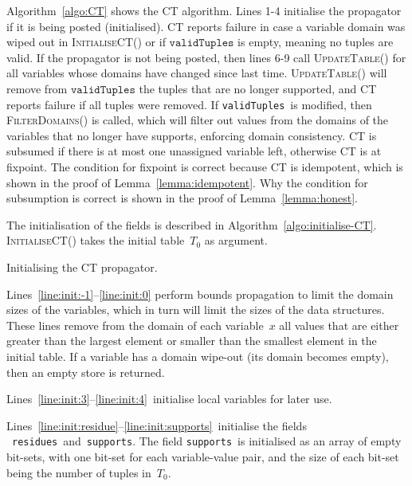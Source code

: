 \documentclass[a4paper,11pt]{article}
\newcommand{\Algoref}[1]{Algorithm~\ref{#1}}
\newcommand{\Linesref}[2]{Lines~\ref{#1}--\ref{#2}}
\newcommand{\CurrTable}{\texttt{validTuples}}
\newcommand{\Supports}{\texttt{supports}}
\newcommand{\Residues}{\texttt{residues}}
\def\UpdateTable{\textsc{UpdateTable}}
\def\FilterDomains{\textsc{FilterDomains}}
\def\InitialiseCT{\textsc{InitialiseCT}}
\newcommand{\localvar}[1]{\mathit{#1}}
\numberwithin{equation}{section}
\begin{document}
\Algoref{algo:CT} shows the CT algorithm. Lines 1-4 initialise the propagator
if it is being posted (initialised). CT reports failure in case a variable domain was
wiped out in \InitialiseCT() or if $\CurrTable$ is empty, meaning no tuples are valid.
If the propagator is not being posted, then
lines 6-9 call \UpdateTable() for all variables whose domains have changed
since last time. \UpdateTable() will remove from $\CurrTable$ the tuples that
are no longer supported, and CT reports failure if all tuples were removed.
If \CurrTable~is modified, then \FilterDomains() is
called, which will filter out values from the domains of the variables that
no longer have supports, enforcing domain consistency.
CT is subsumed if there is at most one unassigned variable
left, otherwise CT is at fixpoint.
The condition for fixpoint is correct because CT is idempotent,
which is shown in the proof of Lemma~\ref{lemma:idempotent}.
Why the condition for subsumption is correct is shown in the proof of 
Lemma~\ref{lemma:honest}.



The initialisation of the fields is described in
\Algoref{algo:initialise-CT}. \InitialiseCT() takes the 
initial table~$\localvar{T_0}$ as argument.

\begin{algorithm}[t]
  \begin{algorithmic}[1]  %
    
  \end{algorithmic}
  \caption{Initialising the CT propagator.}
  \label{algo:initialise-CT}
\end{algorithm}

\Linesref{line:init:-1}{line:init:0} perform bounds
  propagation to limit the domain sizes of the variables,
  which in turn will limit the sizes of the data structures.
  These lines remove from the domain of each variable~$x$ all
  values that are either greater 
  than the largest element or smaller than the smallest element in the
  initial table. If a variable has a domain wipe-out
  (its domain becomes empty), then an empty store is returned.

\Linesref{line:init:3}{line:init:4}~initialise local variables for later use.

\Linesref{line:init:residue}{line:init:supports}~initialise the fields
~\Residues~and~\Supports.
The field \Supports~is initialised as an array of empty bit-sets,
with one bit-set for each
variable-value pair, and the size of each
bit-set being the number of tuples in~$T_0$.
\end{document}
